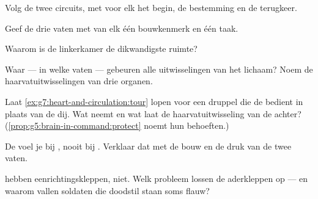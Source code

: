 \begin{exercise}[$\star$]\label{exo:g7:heart-and-circulation:3}
Volg de twee circuits, met voor elk het begin, de bestemming en de
terugkeer.
\end{exercise}

\begin{exercise}[$\star$]\label{exo:g7:heart-and-circulation:4}
Geef de drie  vaten met van elk één bouwkenmerk en één taak.
\end{exercise}

\begin{exercise}[$\star$]\label{exo:g7:heart-and-circulation:5}
Waarom is de linkerkamer de dikwandigste ruimte?
\end{exercise}

\begin{exercise}[$\star$]\label{exo:g7:heart-and-circulation:6}
Waar --- in welke  vaten --- gebeuren alle uitwisselingen van het
lichaam? Noem de haarvatuitwisselingen van drie organen.
\end{exercise}

\begin{exercise}[$\star\star$]\label{exo:g7:heart-and-circulation:7}
Laat \cref{ex:g7:heart-and-circulation:tour} lopen voor een druppel die de
 bedient in plaats van de dij. Wat neemt en wat laat de
haarvatuitwisseling van de  achter?
(\cref{prop:g5:brain-in-command:protect} noemt hun behoeften.)
\end{exercise}

\begin{exercise}[$\star\star$]\label{exo:g7:heart-and-circulation:8}
De  voel je bij , nooit bij . Verklaar dat met de
bouw en de druk van de twee vaten.
\end{exercise}

\begin{exercise}[$\star\star$]\label{exo:g7:heart-and-circulation:9}
 hebben eenrichtingskleppen,  niet. Welk probleem lossen de
aderkleppen op --- en waarom vallen soldaten die doodstil staan soms flauw?
\end{exercise}

